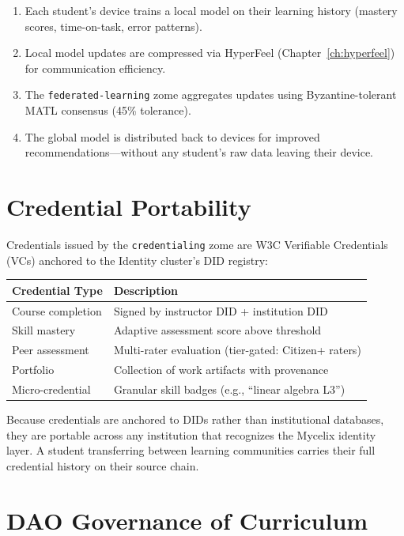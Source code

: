 \documentclass[12pt]{book}
\begin{document}
\begin{enumerate}
  \item Each student's device trains a local model on their learning
    history (mastery scores, time-on-task, error patterns).
  \item Local model updates are compressed via HyperFeel
    (Chapter~\ref{ch:hyperfeel}) for communication efficiency.
  \item The \texttt{federated-learning} zome aggregates updates using
    Byzantine-tolerant MATL consensus (45\% tolerance).
  \item The global model is distributed back to devices for improved
    recommendations---without any student's raw data leaving their device.
\end{enumerate}

\section{Credential Portability}

Credentials issued by the \texttt{credentialing} zome are W3C Verifiable
Credentials (VCs) anchored to the Identity cluster's DID registry:

\begin{longtable}{lp{8cm}}
\toprule
\textbf{Credential Type} & \textbf{Description} \\
\midrule
\endhead
Course completion  & Signed by instructor DID + institution DID \\
Skill mastery      & Adaptive assessment score above threshold \\
Peer assessment    & Multi-rater evaluation (tier-gated: Citizen+ raters) \\
Portfolio          & Collection of work artifacts with provenance \\
Micro-credential   & Granular skill badges (e.g., ``linear algebra L3'') \\
\bottomrule
\end{longtable}

Because credentials are anchored to DIDs rather than institutional
databases, they are portable across any institution that recognizes
the Mycelix identity layer.  A student transferring between learning
communities carries their full credential history on their source chain.

\section{DAO Governance of Curriculum}
\end{document}
